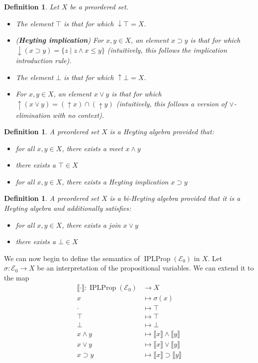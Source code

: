 \documentclass[12pt]{article}
\newtheorem{definition}[theorem]{Definition}
\newcommand{\db}[1]{\llbracket #1 \rrbracket}
\begin{document}
\begin{definition}
Let $X$ be a preordered set.

\begin{itemize}
    \item The element $\top$ is that for which $\downarrow \top = X$.
    \item (\textbf{Heyting implication}) For $x, y \in X$, an element $x \supset y$ is that for which $\downarrow(x \supset y) = \{z \mid z \land x \leq y\}$ (intuitively, this follows the implication introduction rule).
    \item The element $\bot$ is that for which $\uparrow \bot = X$.
    \item For $x, y \in X$, an element $x \lor y$ is that for which $\uparrow(x \lor y) = (\uparrow x) \cap (\uparrow y)$ (intuitively, this follows a version of $\lor$-elimination with no context).
\end{itemize}

\end{definition}

\begin{definition}
A preordered set $X$ is a Heyting algebra provided that:
\begin{itemize}
    \item for all $x, y \in X$, there exists a meet $x \land y$
    \item there exists a $\top \in X$
    \item for all $x, y \in X$, there exists a Heyting implication $x \supset y$
\end{itemize}
\end{definition}

\begin{definition}
A preordered set $X$ is a bi-Heyting algebra provided that it is a Heyting algebra and additionally satisfies:
\begin{itemize}
    \item for all $x, y \in X$, there exists a join $x \lor y$
    \item there exists a $\bot \in X$
\end{itemize}
\end{definition}

We can now begin to define the semantics of $\operatorname{IPLProp}(\mathcal{E}_0)$ in $X$. Let $\sigma: \mathcal{E}_0 \to X$ be an interpretation of the propositional variables. We can extend it to the map
\begin{align*}
\db{\cdot}: \operatorname{IPLProp}(\mathcal{E}_0) &\to X \\
x &\mapsto \sigma(x) \\
\cdot &\mapsto \top \\
\top &\mapsto \top \\
\bot &\mapsto \bot \\
x \land y &\mapsto \db{x} \land \db{y} \\
x \lor y &\mapsto \db{x} \lor \db{y} \\
x \supset y &\mapsto \db{x} \supset \db{y}
\end{align*}
\end{document}
